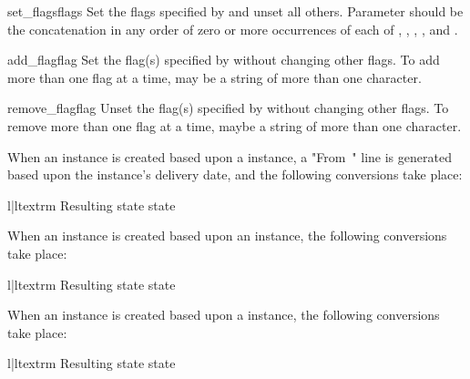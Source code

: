 \begin{methoddesc}{set_flags}{flags}
Set the flags specified by  and unset all others. Parameter
 should be the concatenation in any order of zero or more
occurrences of each of , , ,
, and .
\end{methoddesc}

\begin{methoddesc}{add_flag}{flag}
Set the flag(s) specified by  without changing other flags. To add
more than one flag at a time,  may be a string of more than one
character.
\end{methoddesc}

\begin{methoddesc}{remove_flag}{flag}
Unset the flag(s) specified by  without changing other flags. To
remove more than one flag at a time,  maybe a string of more than one
character.
\end{methoddesc}

When an  instance is created based upon a
 instance, a "From~" line is generated based upon the
 instance's delivery date, and the following conversions
take place:

\begin{tableii}{l|l}{textrm}
    {Resulting state}{ state}
\end{tableii}

When an  instance is created based upon an 
instance, the following conversions take place:

\begin{tableii}{l|l}{textrm}
    {Resulting state}{ state}
\end{tableii}

When an  instance is created based upon a
 instance, the following conversions take place:

\begin{tableii}{l|l}{textrm}
    {Resulting state}{ state}
\end{tableii}

